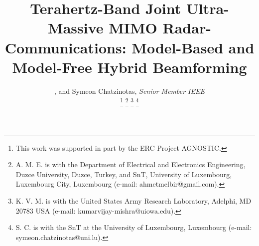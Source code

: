 \documentclass[journal,10pt]{IEEEtran}
\begin{document}
	
	
	
	\title{Terahertz-Band Joint Ultra-Massive MIMO Radar-Communications: Model-Based and Model-Free Hybrid Beamforming}
	
	\author{, and Symeon Chatzinotas, \textit{Senior Member IEEE}
		
		\thanks{This work was supported in part by the  ERC Project  AGNOSTIC.}
		\thanks{A. M. E. is with the Department of Electrical and Electronics Engineering, Duzce University, Duzce, Turkey, and  SnT, University of Luxembourg,	Luxembourg City, Luxembourg (e-mail: ahmetmelbir@gmail.com).} 
		\thanks{K. V. M. is with the United States Army Research Laboratory, Adelphi, MD 20783 USA (e-mail: kumarvijay-mishra@uiowa.edu).}
		\thanks{S. C. is with the SnT at the University of Luxembourg, Luxembourg (e-mail: symeon.chatzinotas@uni.lu). }
	}
	
	
	\maketitle
	
\end{document}
